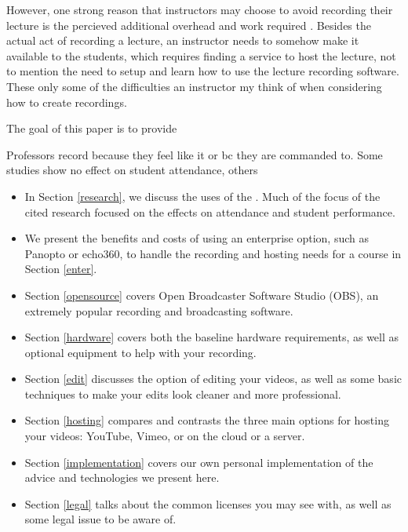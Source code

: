 \documentclass[sigconf]{acmart}
\begin{document}
However, one strong reason that instructors may choose to avoid recording their lecture is the percieved additional overhead and work required \cite{maynor2013student}.
Besides the actual act of recording a lecture, an instructor needs to somehow make it available to the students, which requires finding a service to host the lecture, not to mention the need to setup and learn how to use the lecture recording software.
These only some of the difficulties an instructor my think of when considering how to create recordings.

The goal of this paper is to provide 



Professors record because they feel like it or bc they are commanded to.
Some studies show no effect on student attendance,
others 


\begin{itemize}
	\item In Section \ref{research}, we discuss the uses of the .  Much of the focus of the cited research focused on the effects on attendance and student performance.
	\item We present the benefits and costs of using an enterprise option, such as Panopto or echo360, to handle the recording and hosting needs for a course in Section \ref{enter}.
	\item Section \ref{opensource} covers Open Broadcaster Software Studio (OBS), an extremely popular recording and broadcasting software.
	\item Section \ref{hardware} covers both the baseline hardware requirements, as well as optional equipment to help with your recording.
	\item Section \ref{edit} discusses the option of editing your videos, as well as some basic techniques to make your edits look cleaner and more professional.
	\item Section \ref{hosting} compares and contrasts the three main options for hosting your videos: YouTube, Vimeo, or on the cloud or a server.
	\item Section \ref{implementation} covers our own personal implementation of the advice and technologies we present here.
	\item Section \ref{legal} talks about the common licenses you may see with, as well as some legal issue to be aware of.
\end{itemize}
\end{document}
